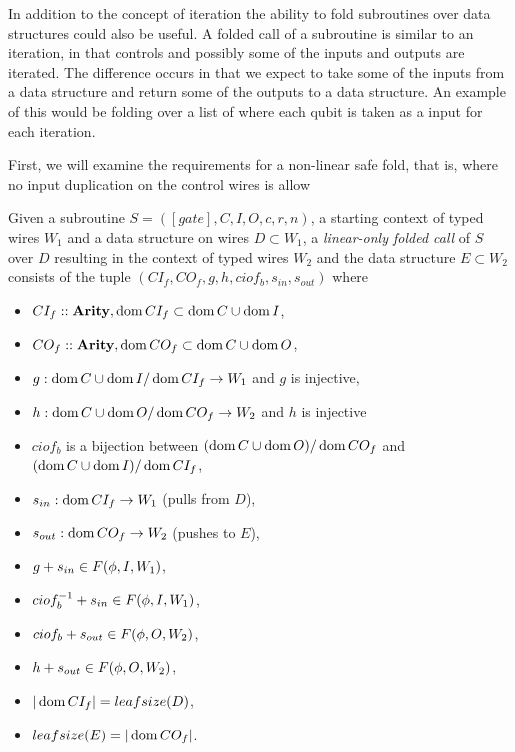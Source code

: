 In addition to the concept of iteration the ability to fold subroutines over data structures could
also be useful. A folded call of a subroutine is similar to an iteration, in that controls and
possibly some of the inputs and outputs are iterated. The difference occurs in that we expect to
take some of the inputs from a data structure and return some of the outputs to a data structure.
An example of this would be folding over a list of  where each qubit is taken as a input
for each iteration.

First, we will examine the requirements for a non-linear safe fold, that is, where no input
duplication on the control wires is allow

\begin{definition}\label{def:linear_only_subroutine_fold}
  Given a subroutine $S=([gate],C,I,O,c,r,n)$, a starting context of typed wires $W_1$ and a data
  structure on wires $D\subset W_1$, a \emph{linear-only folded call} of $S$ over $D$ resulting in
  the context of typed wires $W_2$ and the data structure $E\subset W_2$ consists of the tuple
  $(CI_f,CO_f, g, h, ciof_b, s_{in}, s_{out})$ where
  \begin{itemize}
    \item $CI_f::\mathbf{{Arity}}, \operatorname*{dom}{CI_f} \subset \operatorname*{dom}{C}\cup \operatorname*{dom}{I}$,
    \item $CO_f::\mathbf{{Arity}}, \operatorname*{dom}{CO_f} \subset \operatorname*{dom}{C}\cup \operatorname*{dom}{O}$,
    \item $g:\operatorname*{dom}{C}\cup\operatorname*{dom} I / \operatorname*{dom}{CI_f} \to W_1$ and $g$ is injective,
    \item $h:\operatorname*{dom}{C}\cup\operatorname*{dom} O /\operatorname*{dom}{CO_f} \to W_2$ and $h$ is injective
    \item $ciof_b$ is a bijection between $(\operatorname*{dom}{C}\cup\operatorname*{dom}{O})/\operatorname*{dom}{CO_f}$
      and $(\operatorname*{dom}{C}\cup\operatorname*{dom}{I})/\operatorname*{dom}{CI_f}$,
    \item $s_{in}: \operatorname*{dom}{CI_f} \to W_1$ (pulls from $D$),
    \item $s_{out}: \operatorname*{dom}{CO_f} \to W_2$ (pushes to $E$),
    \item $g + s_{in} \in F(\phi,I,W_1)$,
    \item $ciof_b^{-1} + s_{in} \in F(\phi,I,W_1)$,
    \item $ciof_b + s_{out} \in F(\phi,O,W_2)$,
    \item $h + s_{out} \in F(\phi,O,W_2)$,
    \item $|\operatorname*{dom}{CI_f}| = leafsize(D)$,
    \item $leafsize(E) = |\operatorname*{dom}{CO_f}|$.
  \end{itemize}
\end{definition}

